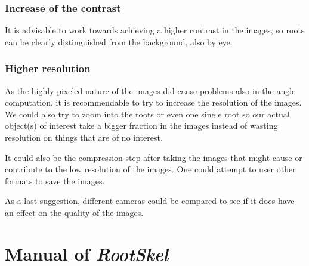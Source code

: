 

\subsection{Increase of the contrast}

It is advisable to work towards achieving a higher contrast in the images, so roots can be clearly distinguished from the background, also by eye.




\subsection{Higher resolution}


As the highly pixeled nature of the images did cause problems also in the angle computation, it is recommendable to try to increase the resolution of the images. We could also try to zoom into the roots or even one single root so our actual object(s) of interest take a bigger fraction in the images instead of wasting resolution on things that are of no interest. 

It could also be the compression step after taking the images that might cause or contribute to the low resolution of the images. One could attempt to user other formats to save the images. 

As a last suggestion, different cameras could be compared to see if it does have an effect on the quality of the images. 




\chapter{Manual of \textit{RootSkel}}


